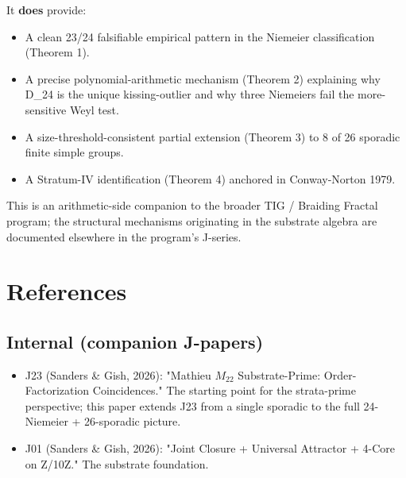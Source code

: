 \documentclass[11pt,reqno]{amsart}
\theoremstyle{plain}
\theoremstyle{definition}
\begin{document}
It \textbf{does} provide:
\begin{itemize}
\item A clean 23/24 falsifiable empirical pattern in the Niemeier classification (Theorem 1).
\item A precise polynomial-arithmetic mechanism (Theorem 2) explaining why D_24 is the unique kissing-outlier and why three Niemeiers fail the more-sensitive Weyl test.
\item A size-threshold-consistent partial extension (Theorem 3) to 8 of 26 sporadic finite simple groups.
\item A Stratum-IV identification (Theorem 4) anchored in Conway-Norton 1979.
\end{itemize}

This is an arithmetic-side companion to the broader TIG / Braiding Fractal program; the structural mechanisms originating in the substrate algebra are documented elsewhere in the program's J-series.

\section{References}

\subsection{Internal (companion J-papers)}
\begin{itemize}
\item J23 (Sanders & Gish, 2026): "Mathieu $M_{22}$ Substrate-Prime: Order-Factorization Coincidences." The starting point for the strata-prime perspective; this paper extends J23 from a single sporadic to the full 24-Niemeier + 26-sporadic picture.
\item J01 (Sanders \& Gish, 2026): "Joint Closure + Universal Attractor + 4-Core on Z/10Z." The substrate foundation.
\end{itemize}
\end{document}
